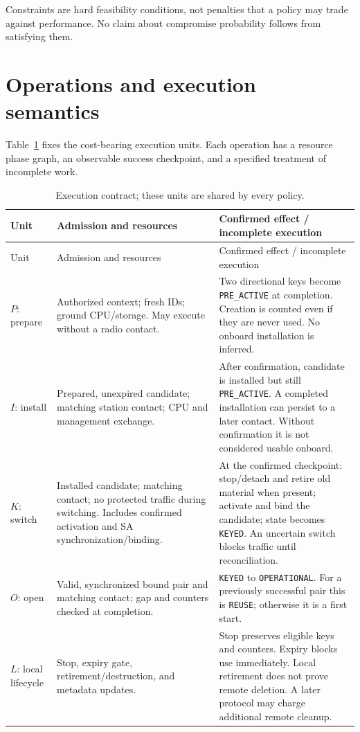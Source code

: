 \documentclass[11pt,a4paper]{article}
\newcommand{\act}[1]{\texttt{#1}}
\begin{document}
Constraints are hard feasibility conditions, not penalties that a policy may trade against performance. No claim about compromise probability follows from satisfying them.

\section{Operations and execution semantics}
Table~\ref{tab:ops} fixes the cost-bearing execution units. Each operation has a resource phase graph, an observable success checkpoint, and a specified treatment of incomplete work.
\begin{longtable}{@{}p{22mm}p{55mm}p{64mm}@{}}
\caption{Execution contract; these units are shared by every policy.}\label{tab:ops}\\
\toprule
Unit & Admission and resources & Confirmed effect / incomplete execution\\
\midrule\endfirsthead
\toprule Unit & Admission and resources & Confirmed effect / incomplete execution\\\midrule\endhead
$P$: prepare & Authorized context; fresh IDs; ground CPU/storage. May execute without a radio contact. & Two directional keys become \act{PRE\_ACTIVE} at completion. Creation is counted even if they are never used. No onboard installation is inferred.\\
$I$: install & Prepared, unexpired candidate; matching station contact; CPU and management exchange. & After confirmation, candidate is installed but still \act{PRE\_ACTIVE}. A completed installation can persist to a later contact. Without confirmation it is not considered usable onboard.\\
$K$: switch & Installed candidate; matching contact; no protected traffic during switching. Includes confirmed activation and SA synchronization/binding. & At the confirmed checkpoint: stop/detach and retire old material when present; activate and bind the candidate; state becomes \act{KEYED}. An uncertain switch blocks traffic until reconciliation.\\
$O$: open & Valid, synchronized bound pair and matching contact; gap and counters checked at completion. & \act{KEYED} to \act{OPERATIONAL}. For a previously successful pair this is \act{REUSE}; otherwise it is a first start.\\
$L$: local lifecycle & Stop, expiry gate, retirement/destruction, and metadata updates. & Stop preserves eligible keys and counters. Expiry blocks use immediately. Local retirement does not prove remote deletion. A later protocol may charge additional remote cleanup.\\
\bottomrule
\end{longtable}
\end{document}
